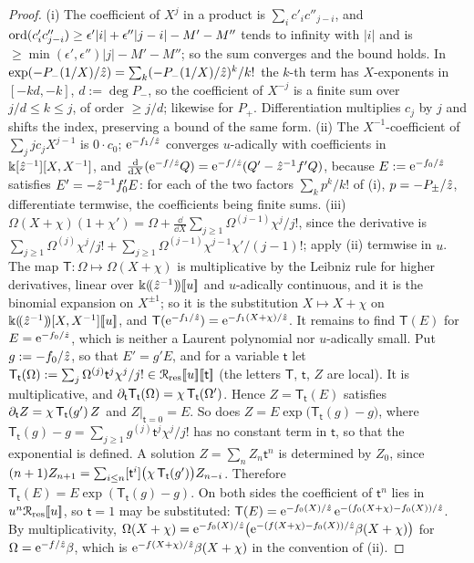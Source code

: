 \begin{proof}
(i) The coefficient of $X^j$ in a product is $\sum_ic'_ic''_{j-i}$, and $\operatorname{ord}(c'_ic''_{j-i})\geq\epsilon'|i|+\epsilon''|j-i|-M'-M''$ tends to infinity with $|i|$ and is $\geq\min(\epsilon',\epsilon'')|j|-M'-M''$; so the sum converges and the bound holds. In $\exp(-P_-(1/X)/\hat{z})=\sum_k(-P_-(1/X)/\hat{z})^k/k!$ the $k$-th term has $X$-exponents in $[-kd,-k]$, $d:=\deg P_-$, so the coefficient of $X^{-j}$ is a finite sum over $j/d\leq k\leq j$, of order $\geq j/d$; likewise for $P_+$. Differentiation multiplies $c_j$ by $j$ and shifts the index, preserving a bound of the same form. (ii) The $X^{-1}$-coefficient of $\sum_jjc_jX^{j-1}$ is $0\cdot c_0$; $\mathrm{e}^{-f_1/\hat{z}}$ converges $u$-adically with coefficients in $\Bbbk[\hat{z}^{-1}][X,X^{-1}]$, and $\frac{\mathrm{d}}{\mathrm{d} X}(\mathrm{e}^{-f/\hat{z}}Q)=\mathrm{e}^{-f/\hat{z}}(Q'-\hat{z}^{-1}f'Q)$, because $E:=\mathrm{e}^{-f_0/\hat{z}}$ satisfies $E'=-\hat{z}^{-1}f_0'E$: for each of the two factors $\sum_kp^k/k!$ of (i), $p=-P_\pm/\hat{z}$, differentiate termwise, the coefficients being finite sums. (iii) $\Omega(X+\chi)(1+\chi')=\Omega+\frac{\dd}{\dd X}\sum_{j\geq1}\Omega^{(j-1)}\chi^j/j!$, since the derivative is $\sum_{j\geq1}\Omega^{(j)}\chi^j/j!+\sum_{j\geq1}\Omega^{(j-1)}\chi^{j-1}\chi'/(j-1)!$; apply (ii) termwise in $u$. The map $\mathsf T\colon\Omega\mapsto\Omega(X+\chi)$ is multiplicative by the Leibniz rule for higher derivatives, linear over $\Bbbk(\!(\hat{z}^{-1})\!)[\![ u ]\!]$ and $u$-adically continuous, and it is the binomial expansion on $X^{\pm1}$; so it is the substitution $X\mapsto X+\chi$ on $\Bbbk(\!(\hat{z}^{-1})\!)[X,X^{-1}][\![ u ]\!]$, and $\mathsf T(\mathrm{e}^{-f_1/\hat{z}})=\mathrm{e}^{-f_1(X+\chi)/\hat{z}}$. It remains to find $\mathsf T(E)$ for $E=\mathrm{e}^{-f_0/\hat{z}}$, which is neither a Laurent polynomial nor $u$-adically small. Put $g:=-f_0/\hat{z}$, so that $E'=g'E$, and for a variable $\mathsf t$ let $\mathsf T_{\mathsf t}(\Omega):=\sum_j\Omega^{(j)}\mathsf t^j\chi^j/j!\in\mathcal{R}_{\mathrm{res}}[\![ u ]\!][\![ \mathsf t ]\!]$ (the letters $\mathsf T$, $\mathsf t$, $Z$ are local). It is multiplicative, and $\partial_{\mathsf t}\mathsf T_{\mathsf t}(\Omega)=\chi\,\mathsf T_{\mathsf t}(\Omega')$. Hence $Z=\mathsf T_{\mathsf t}(E)$ satisfies $\partial_{\mathsf t}Z=\chi\,\mathsf T_{\mathsf t}(g')\,Z$ and $Z|_{\mathsf t=0}=E$. So does $Z=E\exp\bigl(\mathsf T_{\mathsf t}(g)-g\bigr)$, where $\mathsf T_{\mathsf t}(g)-g=\sum_{j\geq1}g^{(j)}\mathsf t^j\chi^j/j!$ has no constant term in $\mathsf t$, so that the exponential is defined. A solution $Z=\sum_nZ_n\mathsf t^n$ is determined by $Z_0$, since $(n+1)Z_{n+1}=\sum_{i\leq n}[\mathsf t^i]\bigl(\chi\,\mathsf T_{\mathsf t}(g')\bigr)Z_{n-i}$. Therefore $\mathsf T_{\mathsf t}(E)=E\exp(\mathsf T_{\mathsf t}(g)-g)$. On both sides the coefficient of $\mathsf t^n$ lies in $u^n\mathcal{R}_{\mathrm{res}}[\![ u ]\!]$, so $\mathsf t=1$ may be substituted: $\mathsf T(E)=\mathrm{e}^{-f_0(X)/\hat{z}}\,\mathrm{e}^{-(f_0(X+\chi)-f_0(X))/\hat{z}}$. By multiplicativity, $\Omega(X+\chi)=\mathrm{e}^{-f_0(X)/\hat{z}}\bigl(\mathrm{e}^{-(f(X+\chi)-f_0(X))/\hat{z}}\beta(X+\chi)\bigr)$ for $\Omega=\mathrm{e}^{-f/\hat{z}}\beta$, which is $\mathrm{e}^{-f(X+\chi)/\hat{z}}\beta(X+\chi)$ in the convention of (ii).
\end{proof}
